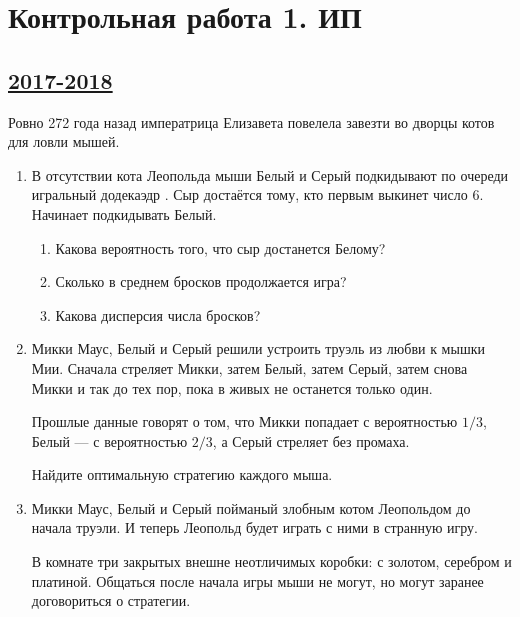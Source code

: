 \newpage
\thispagestyle{empty}
\section{Контрольная работа 1. ИП}



\subsection[2017-2018]{\hyperref[sec:sol_kr_01_ip_2017_2018]{2017-2018}}
\label{sec:kr_01_ip_2017_2018}



Ровно 272 года назад императрица Елизавета повелела завезти во дворцы котов для ловли мышей.


\begin{enumerate}

\item В отсутствии кота Леопольда мыши Белый и Серый подкидывают по очереди игральный додекаэдр
.
Сыр достаётся тому, кто первым выкинет число 6. Начинает подкидывать Белый.

\begin{enumerate}
  \item Какова вероятность того, что сыр достанется Белому?
  \item Сколько в среднем бросков продолжается игра?
  \item Какова дисперсия числа бросков?
\end{enumerate}

\item Микки Маус, Белый и Серый решили устроить труэль из любви к мышки Мии. Сначала стреляет Микки, затем Белый, затем Серый, затем снова Микки и так до тех пор, пока в живых не останется только один.

Прошлые данные говорят о том, что Микки попадает с вероятностью $1/3$, Белый — с вероятностью $2/3$, а Серый стреляет без промаха.

Найдите оптимальную стратегию каждого мыша.

\item Микки Маус, Белый и Серый пойманый злобным котом Леопольдом до начала труэли. И теперь Леопольд будет играть с ними в странную игру.

В комнате три закрытых внешне неотличимых коробки: с золотом, серебром и платиной. Общаться после начала игры мыши не могут, но могут заранее договориться о стратегии.


\end{enumerate}
